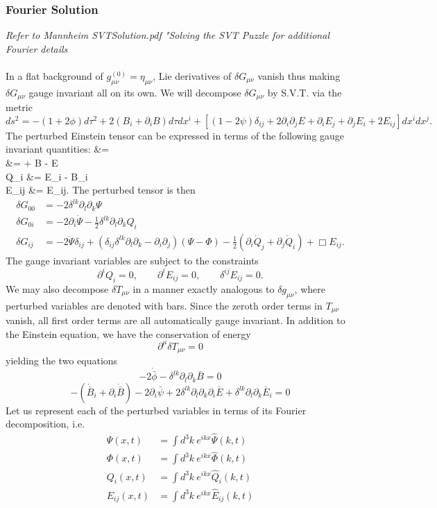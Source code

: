 \documentclass[10pt,letterpaper]{article}
\newcommand{\plr}[1]{\left(#1\right)} %
\newcommand{\blr}[1]{\left[#1\right]} %
\newcommand{\be}{\begin{equation}} %
\newcommand{\ee}{\end{equation}} %
\def\ba#1\ea{\begin{align*}#1\end{align*}} %
\newcommand{\pd}{\partial}
\numberwithin{equation}{section}
\begin{document}
\subsubsection{Fourier Solution}
\emph{ Refer to Mannheim SVTSolution.pdf "Solving the SVT Puzzle for additional Fourier details }
\\ \\
In a flat background of $g_{\mu\nu}^{(0)} = \eta_{\mu\nu}$, Lie derivatives of $\delta G_{\mu\nu}$ vanish thus making $\delta G_{\mu\nu}$ gauge invariant all on its own. We will decompose $\delta G_{\mu\nu}$ by S.V.T. via the metric
\be
	ds^2 = -(1+2\phi)d\tau^2 + 2(B_i + \pd_i B)d\tau dx^i + \blr{ (1-2\psi)\delta_{ij} + 2\pd_i \pd_j E + \pd_i E_j + \pd_j E_i + 2E_{ij}}dx^idx^j.
\ee
The perturbed Einstein tensor can be expressed in terms of the following gauge invariant quantities:
\ba
	\Psi &= \psi\\
	\Phi &= \phi + \dot B - \ddot E\\
	Q_i &= \dot E_i - B_i\\
	E_{ij} &= E_{ij}.
\ea
The perturbed tensor is then 
\begin{align}
	\delta G_{00} &= -2  \delta^{lk}\pd_l\pd_k \Psi \\
	\delta G_{0i}  &= -2\pd_i \dot \Psi - \frac12  \delta^{lk}\pd_l\pd_k Q_i \\
	\delta G_{ij} &= -2\ddot \Psi \delta_{ij} + (\delta_{ij} \delta^{lk}\pd_l\pd_k-\pd_i \pd_j)(\Psi - \Phi) - \frac12\plr{\pd_i \dot Q_j+\pd_j \dot Q_i}  + \Box E_{ij}.
\end{align}
The gauge invariant variables are subject to the constraints
\be
	\pd^i Q_i = 0,\qquad \pd^i E_{ij} = 0,\qquad \delta^{ij}E_{ij} = 0.
\ee
We may also decompose $\delta T_{\mu\nu}$ in a manner exactly analogous to $\delta g_{\mu\nu}$, where perturbed variables are denoted with bars. Since the zeroth order terms in $T_{\mu\nu}$ vanish, all first order terms are all automatically gauge invariant. In addition to the Einstein equation, we have the conservation of energy
\be
	\pd^\mu \delta T_{\mu\nu} = 0
\ee
yielding the two equations
\be
	-2\dot{\bar{\phi}} -  \delta^{lk}\pd_l\pd_k \bar B = 0
\ee
\be
	-(\dot{\bar{B}}_i + \pd_i \dot{\bar B}) - 2\pd_i \bar\psi + 2 \delta^{lk}\pd_l\pd_k\pd_i\bar E +  \delta^{lk}\pd_l\pd_k \bar{E}_i = 0
\ee
Let us represent each of the perturbed variables in terms of its Fourier decomposition, i.e.
\begin{align}
	\Psi(x,t) &= \int d^3k\  e^{ikx} \hat \Psi(k,t)\label{fourier_Psi}\\
	\Phi(x,t) &= \int d^3k\  e^{ikx} \hat \Phi(k,t)\\
	Q_i(x,t)&= \int d^3k\  e^{ikx} \hat Q_i(k,t)\label{fourier_Qv}\\
	E_{ij}(x,t) &= \int d^3k\  e^{ikx} \hat E_{ij}(k,t)\label{fourier_Et}
\end{align}
\end{document}
